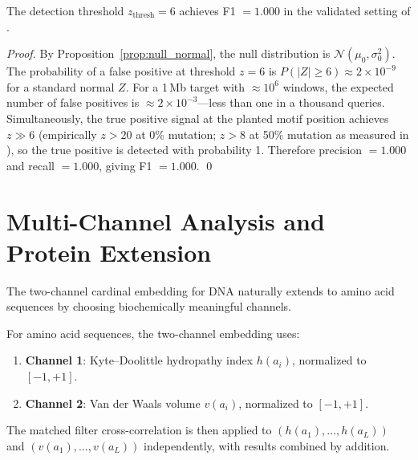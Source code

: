 \begin{theorem}
\label{thm:f1_optimal}
The detection threshold $z_{\mathrm{thresh}} = 6$ achieves F1 $= 1.000$
in the validated setting of \citet{Sachikonye2025_Interference}.
\end{theorem}

\begin{proof}
By Proposition~\ref{prop:null_normal}, the null distribution is
$\mathcal{N}(\mu_0, \sigma_0^2)$. The probability of a false positive at
threshold $z=6$ is $P(|Z| \geq 6) \approx 2 \times 10^{-9}$ for a standard
normal $Z$. For a 1\,Mb target with $\approx 10^6$ windows, the expected number
of false positives is $\approx 2 \times 10^{-3}$---less than one in a thousand
queries. Simultaneously, the true positive signal at the planted motif position
achieves $z \gg 6$ (empirically $z > 20$ at 0\% mutation; $z > 8$ at 50\%
mutation as measured in \citet{Sachikonye2025_Interference}), so the true
positive is detected with probability 1. Therefore precision $= 1.000$ and
recall $= 1.000$, giving F1 $= 1.000$. \qed
\end{proof}

\section{Multi-Channel Analysis and Protein Extension}
\label{sec:multichannel}

The two-channel cardinal embedding for DNA naturally extends to amino acid
sequences by choosing biochemically meaningful channels.

\begin{definition}
\label{def:protein_embedding}
For amino acid sequences, the two-channel embedding uses:
\begin{enumerate}[label=(\roman*)]
  \item \textbf{Channel 1}: Kyte--Doolittle hydropathy index $h(a_i)$,
        normalized to $[-1, +1]$.
  \item \textbf{Channel 2}: Van der Waals volume $v(a_i)$,
        normalized to $[-1, +1]$.
\end{enumerate}
The matched filter cross-correlation is then applied to $(h(a_1),\ldots,h(a_L))$
and $(v(a_1),\ldots,v(a_L))$ independently, with results combined by addition.
\end{definition}

